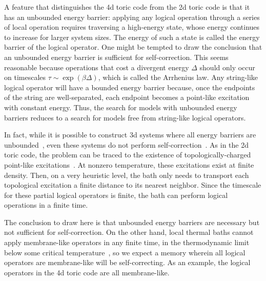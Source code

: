 A feature that distinguishes the 4d toric code from the 2d toric code is that it has an unbounded energy barrier: applying any logical operation through a series of local operation requires traversing a high-energy state, whose energy continues to increase for larger system sizes. The energy of such a state is called the energy barrier of the logical operator. One might be tempted to draw the conclusion that an unbounded energy barrier is sufficient for self-correction. This seems reasonable because operations that cost a divergent energy $\Delta$ should only occur on timescales $\tau \sim \exp (\beta \Delta)$, which is called the Arrhenius law. 
Any string-like logical operator will have a bounded energy barrier because, once the endpoints of the string are well-separated, each endpoint becomes a point-like excitation with constant energy. Thus, the search for models with unbounded energy barriers reduces to a search for models free from string-like logical operators.

In fact, while it is possible to construct 3d systems where all energy barriers are unbounded~\cite{Haah2011Code, Michnicki2014PowerLaw},
even these systems do not perform self-correction~\cite{Siva2017Marginally}. As in the 2d toric code, the problem can be traced to the existence of topologically-charged point-like excitations~\cite{PremHaahNandkishore2017}. At nonzero temperature, these excitations exist at finite density. Then, on a very heuristic level, the bath only needs to transport each topological excitation a finite distance to its nearest neighbor. Since the timescale for these partial logical operators is finite, the bath can perform logical operations in a finite time. 

The conclusion to draw here is that unbounded energy barriers are necessary but not sufficient for self-correction. On the other hand, local thermal baths cannot apply membrane-like operators in any finite time, in the thermodynamic limit below some critical temperature~\cite{Dennis2002Topological, RobertsBartlett2020}, so we expect a memory wherein all logical operators are membrane-like will be self-correcting. As an example, the logical operators in the 4d toric code are all membrane-like.

